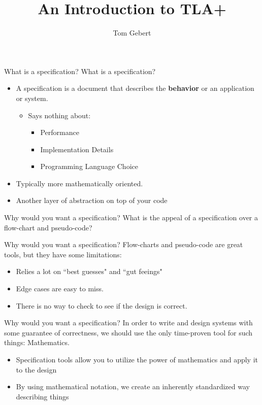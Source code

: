 \documentclass{beamer}
\title{An Introduction to TLA+}
\author{Tom Gebert}
\begin{document}
\frame{\titlepage}
\begin{frame} {What is a specification?}
What is a specification? 
       \begin{itemize}
	       \item A specification is a document that describes the \textbf{behavior} or an application or system. \begin{itemize} 
	       \item Says nothing about: \begin{itemize}
			       \item Performance
			       \item Implementation Details
                               \item Programming Language Choice
	       \end{itemize}
	       \end{itemize}
		       
       \item Typically more mathematically oriented.
       \item Another layer of abstraction on top of your code
       \end{itemize}

\end{frame}
\begin{frame} {Why would you want a specification? }
    What is the appeal of a specification over a flow-chart and pseudo-code? 
\end{frame}

\begin{frame} {Why would you want a specification? }
	Flow-charts and pseudo-code are great tools, but they have some limitations: 
        \begin{itemize}
                \item Relies a lot on ``best guesses" and ``gut feeings"
                \item Edge cases are easy to miss. 
                \item There is no way to check to see if the design is correct.
        \end{itemize}
\end{frame}
\begin{frame} {Why would you want a specification? }
	In order to write and design systems with some guarantee of correctness, we should use the only time-proven tool for such things: Mathematics.
	\begin{itemize} 
		\item Specification tools allow you to utilize the power of mathematics and apply it to the design 
		\item By using mathematical notation, we create an inherently standardized way describing things
	\end{itemize}
\end{frame}
\end{document}
